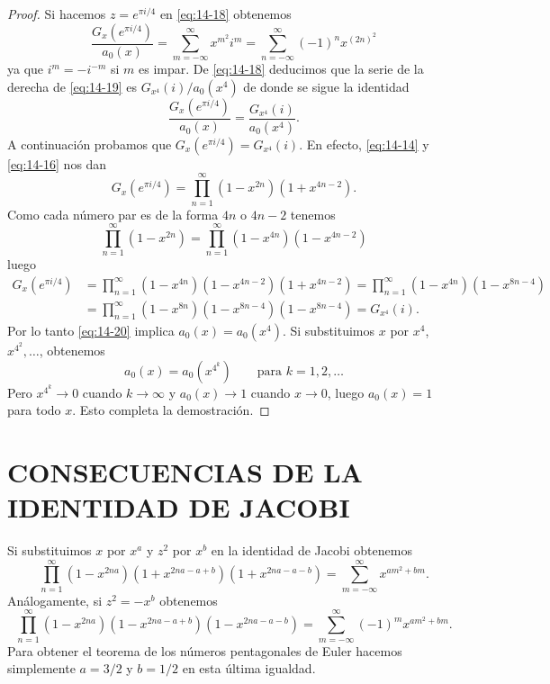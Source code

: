 \begin{proof}
        Si hacemos $z=e^{\pi i/4}$ en \eqref{eq:14-18} obtenemos
        \begin{equation}\label{eq:14-19}
            \frac{G_x(e^{\pi i/4})}{a_0(x)}=\sum_{m=-\infty}^{\infty}x^{m^2}i^m=\sum_{n=-\infty}^{\infty}(-1)^nx^{(2n)^2}
        \end{equation}
        ya que $i^m=-i^{-m}$ si $m$ es impar. De \eqref{eq:14-18} deducimos que la serie de la
        derecha de \eqref{eq:14-19} es $G_{x^4}(i)/a_0(x^4)$ de donde se sigue la identidad
        \begin{equation}\label{eq:14-20}
            \frac{G_x(e^{\pi i/4})}{a_0(x)}=\frac{G_{x^4}(i)}{a_0(x^4)}.
        \end{equation}
        A continuación probamos que $G_x(e^{\pi i/4})=G_{x^4}(i)$. En efecto, \eqref{eq:14-14} y
        \eqref{eq:14-16} nos dan
        \begin{equation*}
            G_x(e^{\pi i/4})=\prod_{n=1}^{\infty}(1-x^{2n})(1+x^{4n-2}).
        \end{equation*}
        Como cada número par es de la forma $4n$ o $4n-2$ tenemos
        \begin{equation*}
            \prod_{n=1}^{\infty}(1-x^{2n})=\prod_{n=1}^{\infty}(1-x^{4n})(1-x^{4n-2})
        \end{equation*}
        luego
        \begin{align*}
            G_x(e^{\pi i/4})&=\prod_{n=1}^{\infty}(1-x^{4n})(1-x^{4n-2})(1+x^{4n-2})=\prod_{n=1}^{\infty}(1-x^{4n})(1-x^{8n-4})\\
            &=\prod_{n=1}^{\infty}(1-x^{8n})(1-x^{8n-4})(1-x^{8n-4})=G_{x^4}(i).
        \end{align*}
        Por lo tanto \eqref{eq:14-20} implica $a_0(x)=a_0(x^4)$. Si substituimos $x$ por $x^4$,
        $x^{4^2},\dots$, obtenemos
        \begin{equation*}
            a_0(x)=a_0(x^{4^k})\qquad\text{para }k=1,2,\dots
        \end{equation*}
        Pero $x^{4^k}\to0$ cuando $k\to\infty$ y $a_0(x)\to1$ cuando $x\to0$, luego $a_0(x)=1$
        para todo $x$. Esto completa la demostración.
    \end{proof}

    \section{CONSECUENCIAS DE LA IDENTIDAD DE JACOBI}

    Si substituimos $x$ por $x^a$ y $z^2$ por $x^b$ en la identidad de Jacobi obtenemos
    \begin{equation*}
        \prod_{n=1}^{\infty}(1-x^{2na})(1+x^{2na-a+b})(1+x^{2na-a-b})=\sum_{m=-\infty}^{\infty}x^{am^2+bm}.
    \end{equation*}
    Análogamente, si $z^2=-x^b$ obtenemos
    \begin{equation*}
        \prod_{n=1}^{\infty}(1-x^{2na})(1-x^{2na-a+b})(1-x^{2na-a-b})=\sum_{m=-\infty}^{\infty}(-1)^mx^{am^2+bm}.
    \end{equation*}
    Para obtener el teorema de los números pentagonales de Euler hacemos simplemente $a=3/2$ y
    $b=1/2$ en esta última igualdad.

